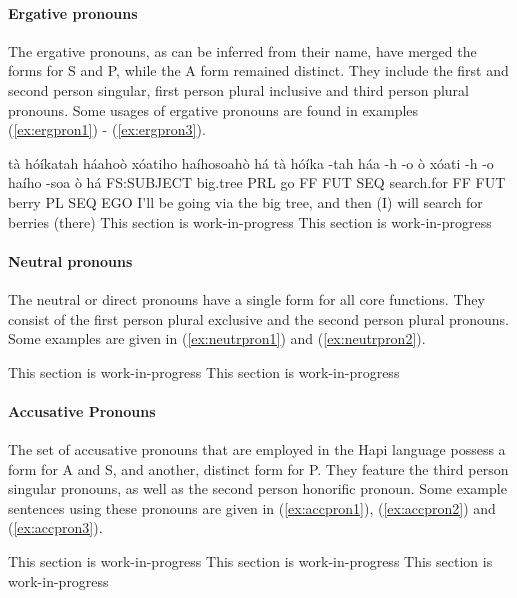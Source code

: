 \documentclass[a4paper, 12pt, oneside]{memoir}
\begin{document}
\paragraph{Ergative pronouns}
The ergative pronouns, as can be inferred from their name, have merged the forms for S and P, while the A form remained distinct. They include the first and second person singular, first person plural inclusive and third person plural pronouns. Some usages of ergative pronouns are found in examples (\ref{ex:ergpron1}) - (\ref{ex:ergpron3}).
\begin{examples}
\newbaarucmd{\cl}{\baarujuncture{\texttt{==}}}
\ex \label{ex:ergpron1}
\words tà hóíkatah háahoò xóatiho haíhosoahò há
\bits tà hóíka -tah háa -h -o \cl ò xóati -h -o haího -soa \cl ò há 
\gloss FS:SUBJECT big.tree PRL go FF FUT SEQ search.for FF FUT berry PL SEQ EGO
\tr I'll be going via the big tree, and then (I) will search for berries (there)
\ex \label{ex:ergpron2}
This section is work-in-progress
\ex \label{ex:ergpron3}
This section is work-in-progress
\end{examples}
\paragraph{Neutral pronouns}
The neutral or direct pronouns have a single form for all core functions. They consist of the first person plural exclusive and the second person plural pronouns. Some examples are given in (\ref{ex:neutrpron1}) and (\ref{ex:neutrpron2}).
\begin{examples}
\ex \label{ex:neutrpron1}
This section is work-in-progress
\ex \label{ex:neutrpron2}
This section is work-in-progress
\end{examples}
\paragraph{Accusative Pronouns}
The set of accusative pronouns that are employed in the Hapi language possess a form for A and S, and another, distinct form for P. They feature the third person singular pronouns, as well as the second person honorific pronoun. Some example sentences using these pronouns are given in (\ref{ex:accpron1}), (\ref{ex:accpron2}) and (\ref{ex:accpron3}).
\begin{examples}
\ex \label{ex:accpron1}
This section is work-in-progress
\ex \label{ex:accpron2}
This section is work-in-progress
\ex \label{ex:accpron3}
This section is work-in-progress
\end{examples}
\end{document}
